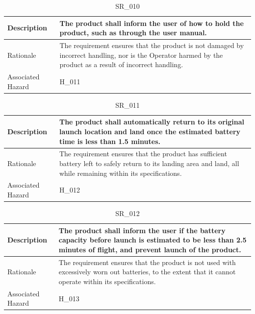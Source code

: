 \documentclass{article}
\begin{document}
\begin{table}[!h]
\begin{center}
\caption {SR\_010} 
\label{SR_010}
\begin{tabular}{ | m{3cm} | m{11cm} | }
\hline
Description & The product shall inform the user of how to hold the product, such as through the user manual. \\
\hline
Rationale & The requirement ensures that the product is not damaged by incorrect handling, nor is the Operator harmed by the product as a result of incorrect handling. \\
\hline
Associated Hazard & H\_011 \\
\hline
\end{tabular}
\end{center}
\end{table}

\begin{table}[!h]
\begin{center}
\caption {SR\_011} 
\label{SR_011}
\begin{tabular}{ | m{3cm} | m{11cm} | }
\hline
Description & The product shall automatically return to its original launch location and land once the estimated battery time is less than 1.5 minutes. \\
\hline
Rationale & The requirement ensures that the product has sufficient battery left to safely return to its landing area and land, all while remaining within its specifications. \\
\hline
Associated Hazard & H\_012 \\
\hline
\end{tabular}
\end{center}
\end{table}

\begin{table}[!h]
\begin{center}
\caption {SR\_012} 
\label{SR_012}
\begin{tabular}{ | m{3cm} | m{11cm} | }
\hline
Description & The product shall inform the user if the battery capacity before launch is estimated to be less than 2.5 minutes of flight, and prevent launch of the product. \\
\hline
Rationale & The requirement ensures that the product is not used with excessively worn out batteries, to the extent that it cannot operate within its specifications. \\
\hline
Associated Hazard & H\_013 \\
\hline
\end{tabular}
\end{center}
\end{table}
\end{document}
